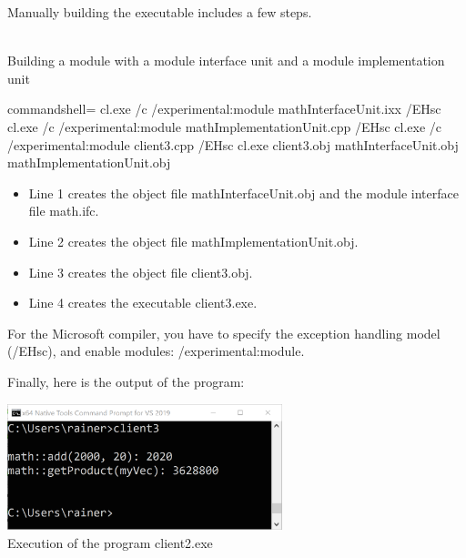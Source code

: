 \begin{tcolorbox}[colback=blue!5!white,colframe=blue!75!black,title=Building the Executable with the Microsoft Compiler]
	
Manually building the executable includes a few steps.

\hspace*{\fill} \\ %
\noindent
Building a module with a module interface unit and a module implementation unit
\begin{tcblisting}{commandshell={}}
cl.exe /c /experimental:module mathInterfaceUnit.ixx /EHsc
cl.exe /c /experimental:module mathImplementationUnit.cpp /EHsc
cl.exe /c /experimental:module client3.cpp /EHsc
cl.exe client3.obj mathInterfaceUnit.obj mathImplementationUnit.obj
\end{tcblisting}

\begin{itemize}
\item 
Line 1 creates the object file mathInterfaceUnit.obj and the module interface file math.ifc.

\item 
Line 2 creates the object file mathImplementationUnit.obj.

\item 
Line 3 creates the object file client3.obj.

\item 
Line 4 creates the executable client3.exe.
\end{itemize}

For the Microsoft compiler, you have to specify the exception handling model (/EHsc), and enable modules: /experimental:module.

Finally, here is the output of the program:

\begin{center}
\includegraphics[width=0.6\textwidth]{content/3/chapter4/images/20.png}\\
Execution of the program client2.exe
\end{center}
\end{tcolorbox}


